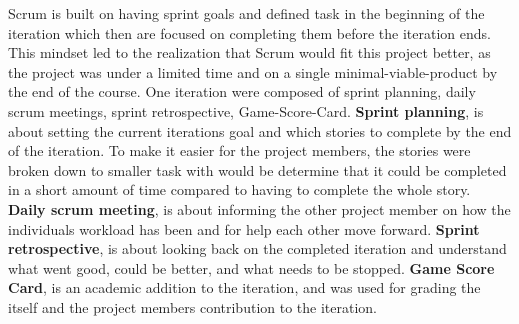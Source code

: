Scrum is built on having sprint goals and defined task in the beginning of the iteration which then are focused on completing them before the iteration ends.
This mindset led to the realization that Scrum would fit this project better, as the project was under a limited time and on a single minimal-viable-product by the end of the course.
One iteration were composed of sprint planning, daily scrum meetings, sprint retrospective, Game-Score-Card.
\textbf{Sprint planning}, is about setting the current iterations goal and which stories to complete by the end of the iteration. 
To make it easier for the project members, the stories were broken down to smaller task with would be determine that it could be completed in a short amount of time compared to having to complete the whole story.
\textbf{Daily scrum meeting}, is about informing the other project member on how the individuals workload has been and for help each other move forward.
\textbf{Sprint retrospective}, is about looking back on the completed iteration and understand what went good, could be better, and what needs to be stopped.
\textbf{Game Score Card}, is an academic addition to the iteration, and was used for grading the itself and the project members contribution to the iteration.


